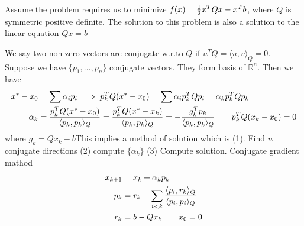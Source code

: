 \begin{slide}
Assume the problem requires us to minimize $f(x) = {1\over 2}x^TQx-x^Tb$, where $Q$ is symmetric positive definite. The solution to this problem is also a solution to the linear equation $Qx=b$

We say two non-zero vectors are conjugate w.r.to $Q$ if $u^TQ=\langle u,v\rangle_Q=0$. Suppose we have $\{p_1,\ldots,p_n\}$ conjugate vectors. They form basis of $\mathbb{R}^n$. Then we have
\begin{align*}
x^{*}-x_0 &= \sum \alpha_ip_i
\implies 
p_k^TQ(x^{*}-x_0) = \sum \alpha_i p_k^TQp_i = \alpha_kp_k^TQp_k
\\
\alpha_k &= {p_k^TQ(x^{*}-x_0)  \over \langle p_k,p_k\rangle_{Q}}
= {p_k^TQ(x^{*}-x_k)  \over \langle p_k,p_k\rangle_{Q}}=-{g_k^Tp_k\over \langle p_k,p_k\rangle_{Q} }\qquad p_k^TQ(x_k-x_0)=0
\end{align*}
where $g_k = Qx_k-b$This implies a method of solution which is (1). Find $n$ conjugate directions (2) compute $\{\alpha_k\}$ (3) Compute solution.
Conjugate gradient mathod
\begin{align*}
x_{k+1} &= x_k + \alpha_kp_k
\\
p_k &= r_k-\sum_{i<k}{\langle p_i,r_k\rangle_Q  \over \langle p_i,p_i\rangle_{Q}}
\\
r_k &= b-Qx_k\qquad  x_0 = 0
\end{align*}
\end{slide}
\begin{slide}

\end{slide}
